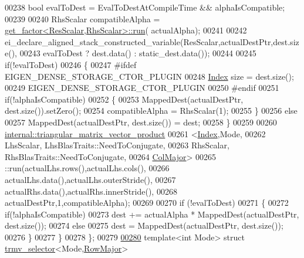 \begin{DoxyCode}
00238     \textcolor{keywordtype}{bool} evalToDest = EvalToDestAtCompileTime && alphaIsCompatible;
00239 
00240     RhsScalar compatibleAlpha = \hyperlink{struct_eigen_1_1internal_1_1get__factor}{get\_factor<ResScalar,RhsScalar>::run}(
      actualAlpha);
00241 
00242     ei\_declare\_aligned\_stack\_constructed\_variable(ResScalar,actualDestPtr,dest.size(),
00243                                                   evalToDest ? dest.data() : static\_dest.data());
00244 
00245     \textcolor{keywordflow}{if}(!evalToDest)
00246     \{
00247 \textcolor{preprocessor}{      #ifdef EIGEN\_DENSE\_STORAGE\_CTOR\_PLUGIN}
00248       \hyperlink{namespace_eigen_a62e77e0933482dafde8fe197d9a2cfde}{Index} size = dest.size();
00249       EIGEN\_DENSE\_STORAGE\_CTOR\_PLUGIN
00250 \textcolor{preprocessor}{      #endif}
00251       \textcolor{keywordflow}{if}(!alphaIsCompatible)
00252       \{
00253         MappedDest(actualDestPtr, dest.size()).setZero();
00254         compatibleAlpha = RhsScalar(1);
00255       \}
00256       \textcolor{keywordflow}{else}
00257         MappedDest(actualDestPtr, dest.size()) = dest;
00258     \}
00259 
00260     \hyperlink{struct_eigen_1_1internal_1_1triangular__matrix__vector__product}{internal::triangular\_matrix\_vector\_product}
00261       <\hyperlink{namespace_eigen_a62e77e0933482dafde8fe197d9a2cfde}{Index},Mode,
00262        LhsScalar, LhsBlasTraits::NeedToConjugate,
00263        RhsScalar, RhsBlasTraits::NeedToConjugate,
00264        \hyperlink{group__enums_ggaacded1a18ae58b0f554751f6cdf9eb13a0cbd4bdd0abcfc0224c5fcb5e4f6669a}{ColMajor}>
00265       ::run(actualLhs.rows(),actualLhs.cols(),
00266             actualLhs.data(),actualLhs.outerStride(),
00267             actualRhs.data(),actualRhs.innerStride(),
00268             actualDestPtr,1,compatibleAlpha);
00269 
00270     \textcolor{keywordflow}{if} (!evalToDest)
00271     \{
00272       \textcolor{keywordflow}{if}(!alphaIsCompatible)
00273         dest += actualAlpha * MappedDest(actualDestPtr, dest.size());
00274       \textcolor{keywordflow}{else}
00275         dest = MappedDest(actualDestPtr, dest.size());
00276     \}
00277   \}
00278 \};
00279 
\hyperlink{struct_eigen_1_1internal_1_1trmv__selector_3_01_mode_00_01_row_major_01_4}{00280} \textcolor{keyword}{template}<\textcolor{keywordtype}{int} Mode> \textcolor{keyword}{struct }\hyperlink{struct_eigen_1_1internal_1_1trmv__selector}{trmv\_selector}<Mode,\hyperlink{group__enums_ggaacded1a18ae58b0f554751f6cdf9eb13acfcde9cd8677c5f7caf6bd603666aae3}{RowMajor}>

\end{DoxyCode}
